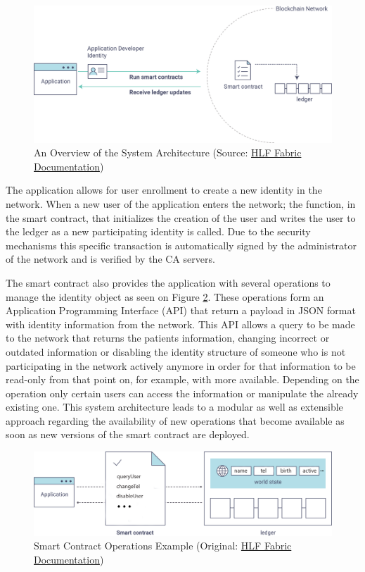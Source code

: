 \begin{figure}[ht] \centering
  \includegraphics[width=1\linewidth]{imgs/hyperledgerAppOverview.png}
  \caption{\label{fig:appOverview}An Overview of the System Architecture
  (Source:
  \href{http://hyperledger-fabric.readthedocs.io/en/latest/write_first_app.html}{HLF
  Fabric Documentation})} \end{figure}

The application allows for user enrollment to create a new identity in the
network.  When a new user of the application enters the network; the function,
in the smart contract, that initializes the creation of the user and writes the
user to the ledger as a new participating identity is called. Due to the
security mechanisms this specific transaction is automatically signed by the
administrator of the network and is verified by the CA servers.

The smart contract also provides the application with several operations to
manage the identity object as seen on Figure \ref{fig:smartContractOverview}.
These operations form an Application Programming Interface (API) that return a
payload in JSON format with identity information from the network.  This API
allows a query to be made to the network that returns the patients information,
changing incorrect or outdated information or disabling the identity structure
of someone who is not participating in the network actively anymore in order
for that information to be read-only from that point on, for example, with more
available.  Depending on the operation only certain users can access the
information or manipulate the already existing one.  This system architecture
leads to a modular as well as extensible approach regarding the availability of
new operations that become available as soon as new versions of the smart
contract are deployed.  

\begin{figure}[ht] 
  \centering
  \includegraphics[width=1\linewidth]{imgs/smartContractOverview.png}
  \caption{\label{fig:smartContractOverview}Smart Contract Operations Example
  (Original:
  \href{http://hyperledger-fabric.readthedocs.io/en/latest/write_first_app.html}{HLF
  Fabric Documentation})} 
\end{figure}
